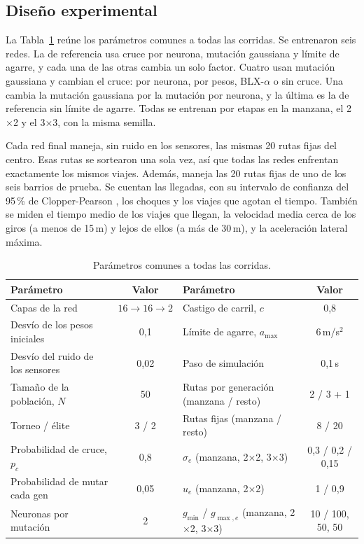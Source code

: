 \documentclass[final]{article}
\begin{document}
\subsection{Diseño experimental}

La Tabla~\ref{tab:parametros} reúne los parámetros comunes a todas las corridas.
Se entrenaron seis redes.
La de referencia usa cruce por neurona, mutación gaussiana y límite de agarre, y cada una de las otras cambia un solo factor.
Cuatro usan mutación gaussiana y cambian el cruce: por neurona, por pesos, BLX-$\alpha$ o sin cruce.
Una cambia la mutación gaussiana por la mutación por neurona, y la última es la de referencia sin límite de agarre.
Todas se entrenan por etapas en la manzana, el 2$\times$2 y el 3$\times$3, con la misma semilla.

Cada red final maneja, sin ruido en los sensores, las mismas 20 rutas fijas del centro.
Esas rutas se sortearon una sola vez, así que todas las redes enfrentan exactamente los mismos viajes.
Además, maneja las 20 rutas fijas de uno de los seis barrios de prueba.
Se cuentan las llegadas, con su intervalo de confianza del 95\,\% de Clopper-Pearson \cite{clopper1934}, los choques y los viajes que agotan el tiempo.
También se miden el tiempo medio de los viajes que llegan, la velocidad media cerca de los giros (a menos de 15\,m) y lejos de ellos (a más de 30\,m), y la aceleración lateral máxima.

\begin{table}[!htb]
\centering
\caption{Parámetros comunes a todas las corridas.}
\label{tab:parametros}
\footnotesize
\setlength{\tabcolsep}{3pt}
\begin{tabular}{lc@{\hspace{10pt}}lc}
\toprule
Parámetro & Valor & Parámetro & Valor \\
\midrule
Capas de la red & $16\to16\to2$ & Castigo de carril, $c$ & 0,8 \\
Desvío de los pesos iniciales & 0,1 & Límite de agarre, $a_{\max}$ & 6\,m/s$^2$ \\
Desvío del ruido de los sensores & 0,02 & Paso de simulación & 0,1\,s \\
Tamaño de la población, $N$ & 50 & Rutas por generación (manzana / resto) & 2 / 3 + 1 \\
Torneo / élite & 3 / 2 & Rutas fijas (manzana / resto) & 8 / 20 \\
Probabilidad de cruce, $p_c$ & 0,8 & $\sigma_e$ (manzana, 2$\times$2, 3$\times$3) & 0,3 / 0,2 / 0,15 \\
Probabilidad de mutar cada gen & 0,05 & $u_e$ (manzana, 2$\times$2) & 1 / 0,9 \\
Neuronas por mutación & 2 & $g_{\min}$ / $g_{\max,e}$ (manzana, 2$\times$2, 3$\times$3) & 10 / 100, 50, 50 \\
\bottomrule
\end{tabular}
\end{table}
\end{document}
